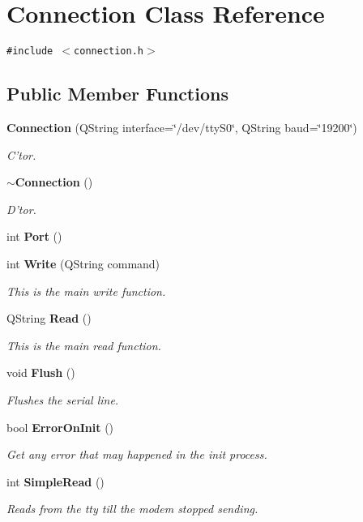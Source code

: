 \section{Connection Class Reference}
\label{classConnection}
{\tt \#include $<$connection.h$>$}

\subsection*{Public Member Functions}
\begin{CompactItemize}
\item 
{\bf Connection} (QString interface=\char`\"{}/dev/tty\-S0\char`\"{}, QString baud=\char`\"{}19200\char`\"{})
\begin{CompactList}\small\item\em C'tor. \item\end{CompactList}\item 
{\bf $\sim$Connection} ()\label{classConnection_a1}

\begin{CompactList}\small\item\em D'tor. \item\end{CompactList}\item 
int {\bf Port} ()\label{classConnection_a2}

\item 
int {\bf Write} (QString command)
\begin{CompactList}\small\item\em This is the main write function. \item\end{CompactList}\item 
QString {\bf Read} ()
\begin{CompactList}\small\item\em This is the main read function. \item\end{CompactList}\item 
void {\bf Flush} ()\label{classConnection_a5}

\begin{CompactList}\small\item\em Flushes the serial line. \item\end{CompactList}\item 
bool {\bf Error\-On\-Init} ()\label{classConnection_a6}

\begin{CompactList}\small\item\em Get any error that may happened in the init process. \item\end{CompactList}\item 
int {\bf Simple\-Read} ()
\begin{CompactList}\small\item\em Reads from the tty till the modem stopped sending. \item\end{CompactList}\end{CompactItemize}


